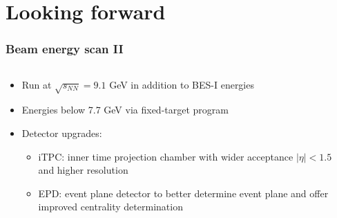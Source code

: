 \documentclass[accentcolor=tud2c,usenames,dvipsnames,colorbacktitle,inverttitle,landscape,german,presentation,t]{tudbeamer}
\begin{document}
  \section{Looking forward}

  \begin{frame}
    \frametitle{Beam energy scan II}
    \begin{columns}[c]
      \begin{column}{0.6\textwidth}
        \begin{itemize}
          \item Run at $\sqrt{s_{NN}} = 9.1$ GeV in addition to BES-I energies
          \item Energies below 7.7 GeV via fixed-target program
          \item Detector upgrades:
          \begin{itemize}
            \item iTPC: inner time projection chamber with wider acceptance
              $|\eta| < 1.5$ and higher resolution
            \item EPD: event plane detector to better determine event plane and
              offer improved centrality determination
          \end{itemize}
        \end{itemize}
      \end{column}
      \begin{column}{0.4\textwidth}
        \begin{center}

\end{center}
\end{column}
\end{columns}
\end{frame}
\end{document}
